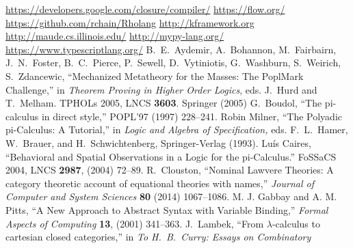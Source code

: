 \documentclass[submission,copyright,creativecommons]{eptcs}
\begin{document}
\begin{thebibliography}{99}

\newcommand{\quantph}[1]{\href{http://arxiv.org/abs/quant-ph/#1}{{ arXiv:quant-ph/#1}}}
\newcommand{\hepth}[1]{\href{http://arxiv.org/abs/hep-th/#1}{{ arXiv:hep-th/#1}}}
\newcommand{\grqc}[1]{\href{http://arxiv.org/abs/gr-qc/#1}{{ arXiv:gr-qc/#1}}}
\newcommand{\qalg}[1]{\href{http://arxiv.org/abs/q-alg/#1}{{ arXiv:q-alg/#1}}}
\newcommand{\mathph}[1]{\href{http://arxiv.org/abs/math-ph/#1}{{ arXiv:math-ph/#1}}}
\newcommand{\Math}[1]{\href{http://arxiv.org/abs/math/#1}{{ arXiv:math/#1}}}
\newcommand{\arxiv}[1]{\href{http://arxiv.org/abs/#1}{{ arXiv:#1}}}

 \href{https://developers.google.com/closure/compiler/}{https://developers.google.com/closure/compiler/}
 \href{https://flow.org/}{https://flow.org/}
 \href{https://github.com/rchain/Rholang}{https://github.com/rchain/Rholang}
 \href{http://kframework.org}{http://kframework.org}
 \href{http://maude.cs.illinois.edu/}{http://maude.cs.illinois.edu/}
 \href{http://mypy-lang.org/}{http://mypy-lang.org/}
 \href{https://www.typescriptlang.org/}{https://www.typescriptlang.org/}
 B.\ E.\ Aydemir, A.\ Bohannon, M.\ Fairbairn, J.\ N.\ Foster, B.\ C.\ Pierce, P.\ Sewell, D.\ Vytiniotis, G.\ Washburn, S.\ Weirich, S.\ Zdancewic, ``Mechanized Metatheory for the Masses: The PoplMark Challenge,'' in {\em Theorem Proving in Higher Order Logics}, eds. J.\ Hurd and T.\ Melham. TPHOLs 2005, LNCS {\bf 3603}. Springer (2005)
 G.\ Boudol, ``The pi-calculus in direct style,'' POPL'97 (1997) 228--241.
 Robin Milner, ``The Polyadic {pi-Calculus}: A Tutorial,'' in {\em Logic and Algebra of Specification,} eds. F.\ L.\ Hamer, W.\ Brauer, and H.\ Schwichtenberg, Springer-Verlag (1993).
 Lu\'is Caires, ``Behavioral and Spatial Observations in a Logic for the pi-Calculus.''  FoSSaCS 2004, LNCS {\bf 2987}, (2004) 72--89.
 R.\ Clouston, ``Nominal Lawvere Theories: A category theoretic account of equational theories with names,'' {\em Journal of Computer and System Sciences} {\bf 80} (2014) 1067--1086.
 M. J. Gabbay and A. M. Pitts, ``A New Approach to Abstract Syntax with Variable Binding,'' {\em Formal Aspects of Computing} {\bf 13}, (2001) 341--363.
 J.\ Lambek, ``From $\lambda$-calculus to cartesian
closed categories,'' in {\sl To H.\ B.\ Curry: Essays on Combinatory
}
\end{thebibliography}
\end{document}
